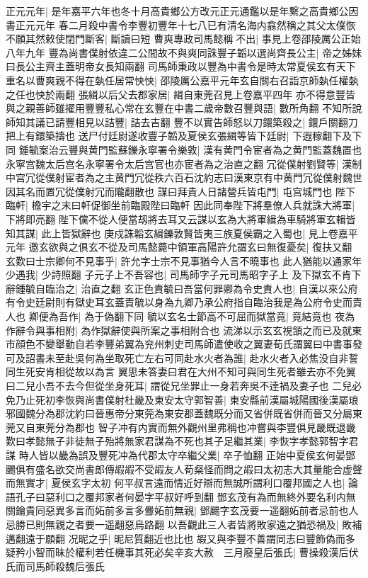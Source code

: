 正元元年|{
	是年嘉平六年也冬十月高貴鄉公方改元正元通鑑以是年繫之高貴鄉公因書正元元年}
春二月殺中書令李豐初豐年十七八已有清名海内翕然稱之其父太僕恢不願其然敕使閉門斷客|{
	斷讀曰短}
曹爽專政司馬懿稱不出|{
	事見上卷邵陵厲公正始八年九年}
豐為尚書僕射依違二公間故不與爽同誅豐子韜以選尚齊長公主|{
	帝之姊妹曰長公主齊主蓋明帝女長知兩翻}
司馬師秉政以豐為中書令是時太常夏侯玄有天下重名以曹爽親不得在埶任居常怏怏|{
	邵陵厲公嘉平元年玄自關右召詣京師埶任權埶之任也怏於兩翻}
張緝以后父去郡家居|{
	緝自東莞召見上卷嘉平四年}
亦不得意豐皆與之親善師雖擢用豐豐私心常在玄豐在中書二歲帝數召豐與語|{
	數所角翻}
不知所說師知其議已請豐相見以詰豐|{
	詰去吉翻}
豐不以實告師怒以刀鐶築殺之|{
	鐶戶關翻刀把上有鐶築擣也}
送尸付廷尉遂收豐子韜及夏侯玄張緝等皆下廷尉|{
	下遐稼翻下及下同}
鍾毓案治云豐與黄門監蘇鑠永寧署令樂敦|{
	漢有黄門令宦者為之黄門監蓋魏置也永寧宫魏太后宫名永寧署令太后宫官也亦宦者為之治直之翻}
冗從僕射劉賢等|{
	漢制中宫冗從僕射宦者為之主黄門冗從秩六百石沈約志曰漢東京有中黄門冗從僕射魏世因其名而置冗從僕射冗而隴翻散也}
謀曰拜貴人日諸營兵皆屯門|{
	屯宫城門也}
陛下臨軒|{
	檐宇之末曰軒促御坐前臨殿陛曰臨軒}
因此同奉陛下將羣僚人兵就誅大將軍|{
	下將即亮翻}
陛下儻不從人便當刼將去耳又云謀以玄為大將軍緝為車騎將軍玄輯皆知其謀|{
	此上皆獄辭也}
庚戍誅韜玄緝鑠敦賢皆夷三族夏侯霸之入蜀也|{
	見上卷嘉平元年}
邀玄欲與之俱玄不從及司馬懿薨中領軍高陽許允謂玄曰無復憂矣|{
	復扶又翻}
玄歎曰士宗卿何不見事乎|{
	許允字士宗不見事猶今人言不曉事也}
此人猶能以通家年少遇我|{
	少詩照翻}
子元子上不吾容也|{
	司馬師字子元司馬昭字子上}
及下獄玄不肯下辭鍾毓自臨治之|{
	治直之翻}
玄正色責毓曰吾當何罪卿為令史責人也|{
	自漢以來公府有令史廷尉則有獄史耳玄蓋責毓以身為九卿乃承公府指自臨治我是為公府令史而責人也}
卿便為吾作|{
	為于偽翻下同}
毓以玄名士節高不可屈而獄當竟|{
	竟結竟也}
夜為作辭令與事相附|{
	為作獄辭使與所案之事相附合也}
流涕以示玄玄視頷之而已及就東市顔色不變舉動自若李豐弟翼為兖州刺史司馬師遣使收之翼妻荀氏謂翼曰中書事發可及詔書未至赴吳何為坐取死亡左右可同赴水火者為誰|{
	赴水火者入必焦没自非誓同生死安肯相從故以為言}
翼思未答妻曰君在大州不知可與同生死者雖去亦不免翼曰二兒小吾不去今但從坐身死耳|{
	謂從兄坐罪止一身若奔吳不逹禍及妻子也}
二兒必免乃止死初李恢與尚書僕射杜畿及東安太守郭智善|{
	東安縣前漢屬城陽國後漢屬琅邪國魏分為郡沈約曰晉惠帝分東莞為東安郡蓋魏既分而又省併既省併而晉又分屬東莞又自東莞分為郡也}
智子冲有内實而無外觀州里弗稱也冲嘗與李豐俱見畿既退畿歎曰孝懿無子非徒無子殆將無家君謀為不死也其子足繼其業|{
	李恢字孝懿郭智字君謀}
時人皆以畿為誤及豐死冲為代郡太守卒繼父業|{
	卒子恤翻}
正始中夏侯玄何晏鄧颺俱有盛名欲交尚書郎傳嘏嘏不受嘏友人荀粲怪而問之嘏曰太初志大其量能合虚聲而無實才|{
	夏侯玄字太初}
何平叔言遠而情近好辯而無誠所謂利口覆邦國之人也|{
	論語孔子曰惡利口之覆邦家者何晏字平叔好呼到翻}
鄧玄茂有為而無終外要名利内無關鑰貴同惡異多言而妬前多言多釁妬前無親|{
	鄧颺字玄茂要一遥翻妬前者忌前也人忌勝已則無親之者要一遥翻惡烏路翻}
以吾觀此三人者皆將敗家遠之猶恐禍及|{
	敗補邁翻遠于願翻}
况昵之乎|{
	昵尼質翻近也比也}
嘏又與李豐不善謂同志曰豐飾偽而多疑矜小智而昧於權利若任機事其死必矣辛亥大赦　三月廢皇后張氏|{
	曹操殺漢后伏氏而司馬師殺魏后張氏}


